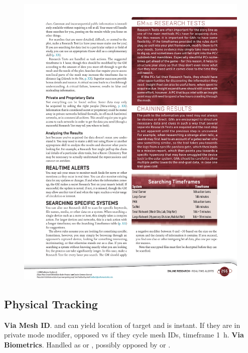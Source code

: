 \begin{figure}[htbp!]%
   \centering
   \includegraphics[scale=0.9]{gfx/mesh-search-time}%
\end{figure}%


\subsection*{Physical Tracking}

\begin{itemize}
   \itembox \textbf{Via Mesh ID}.  and can yield location of target and is instant. If they are in private mode  modifer, opposed vs  if they cycle mesh IDs, timeframe \SI{1}{h}.
   \itembox \textbf{Via Biometrics}. Handled as  or , possibly opposed by  or .
\end{itemize}


